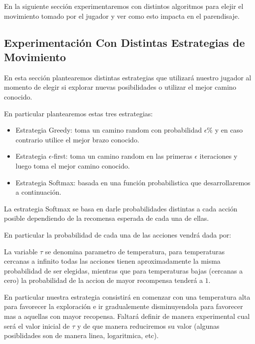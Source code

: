 En la siguiente sección experimentaremos con distintos algoritmos para elejir el movimiento tomado por el jugador y ver como esto impacta en el parendisaje.

\subsection{Experimentación Con Distintas Estrategias de Movimiento}

En esta sección plantearemos distintas estrategias que utilizará nuestro jugador al momento de elegir si explorar nuevas posibilidades o utilizar el mejor camino conocido.

En particular plantearemos estas tres estrategias:


\begin{itemize}
\item Estrategia Greedy: toma un camino random con probabilidad $\epsilon\%$ y en caso contrario utilice el mejor brazo conocido.
\item Estrategia $\epsilon$-first: toma un camino random en las primeras $\epsilon$ iteraciones y luego toma el mejor camino conocido.
\item Estrategia Softmax: basada en una función probabilistica que desarrollaremos a continuación.
\end{itemize}

La estrategia Softmax se basa en darle probabilidades distintas a cada acción posible dependiendo de la recomensa esperada de cada una de ellas.

En particular la probabilidad de cada una de las acciones vendrá dada por:


 La variable $\tau$ se denomina parametro de temperatura, para temperaturas cercanas a infinito todas las acciones tienen aproximadamente la misma probabilidad de ser elegidas, mientras que para temperaturas bajas (cercanas a cero) la probabilidad de la accion de mayor recompensa tenderá a $1$.

En particular nuestra estrategia consistirá en comenzar con una temperatura alta para favorecer la exploración e ir gradualemente disminuyendola para favorecer mas a aquellas con mayor recopensa. Faltará definir de manera experimental cual será el valor inicial de $\tau$ y de que manera reduciremos su valor (algunas posiblidades son de manera linea, logaritmica, etc).

